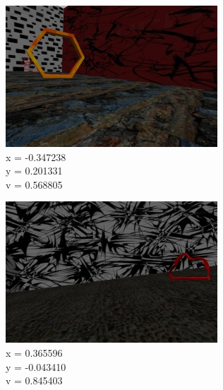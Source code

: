 \begin{figure}[H]
	\centering
	\begin{subfigure}[b]{0.3\textwidth}
		\centering
		\includegraphics[width=\textwidth]{figures/camera_frame_00666.jpg}
		\caption{x = -0.347238\\ y = 0.201331\\v = 0.568805} 
		\label{fig:y equals x}
	\end{subfigure}
	\hfill
	\begin{subfigure}[b]{0.3\textwidth}
		\centering
		\includegraphics[width=\textwidth]{figures/camera_frame_01300.jpg}
		\caption{x = 0.365596\\ y = -0.043410\\v = 0.845403}
		\label{fig:three sin x}
	\end{subfigure}
	\hfill
	\begin{subfigure}[b]{0.3\textwidth}
		\centering

\end{subfigure}
\end{figure}
